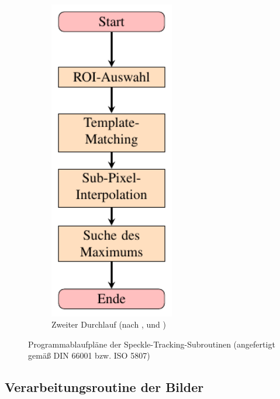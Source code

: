 \begin{figure}[htbp]
\begin{subfigure}[b]{0.3\textwidth}
		\includegraphics[width=0.6\textwidth]{pdf/graph_second_pass}
		\caption[Zweiter Durchlauf]{Zweiter Durchlauf (nach , \cite{Ber12} und \cite{Kov04})}
		\label{fig:graph_second}
	\end{subfigure}
	\caption[Algorithmen]{Programmablaufpläne der Speckle-Tracking-Subroutinen (angefertigt gemäß DIN 66001 bzw. ISO 5807)}
\end{figure}

\subsection{Verarbeitungsroutine der Bilder}

